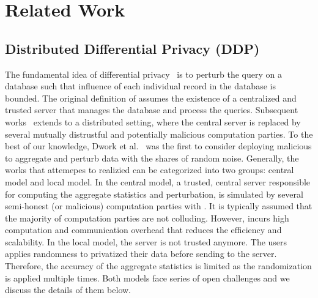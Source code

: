 \chapter{Related Work}
\label{cha:RelatedWork}

\section{Distributed Differential Privacy (DDP)}
\label{sec:DistributedDifferentialPrivacy}

The fundamental idea of differential privacy~\cite{dwork2006differential} is to perturb the query on a database such that influence of each individual record in the database is bounded. The original definition of \differentialprivacy assumes the existence of a centralized and trusted server that manages the database and process the queries. Subsequent works~\cite{dwork2006our} extends \differentialprivacy to a distributed setting, where the central server is replaced by several mutually distrustful and potentially malicious computation parties. To the best of our knowledge, Dwork et al.~\cite{dwork2006our} was the first to consider deploying malicious \smpc to aggregate and perturb data with the shares of random noise. Generally, the works that attemepes to realizied \ddp can be categorized into two groups: central \differentialprivacy model and local \differentialprivacy model. In the central \differentialprivacy model, a trusted, central server responsible for computing the aggregate statistics and perturbation, is simulated by several semi-honest (or malicious) computation parties with \smpc. It is typically assumed that the majority of computation parties are not colluding. However, \smpc incurs high computation and communication overhead that reduces the efficiency and scalability. In the local \differentialprivacy model, the server is not trusted anymore. The users applies randomness to privatized their data before sending to the server. Therefore, the accuracy of the aggregate statistics is limited as the randomization is applied multiple times. Both models face series of open challenges and we discuss the details of them below.

